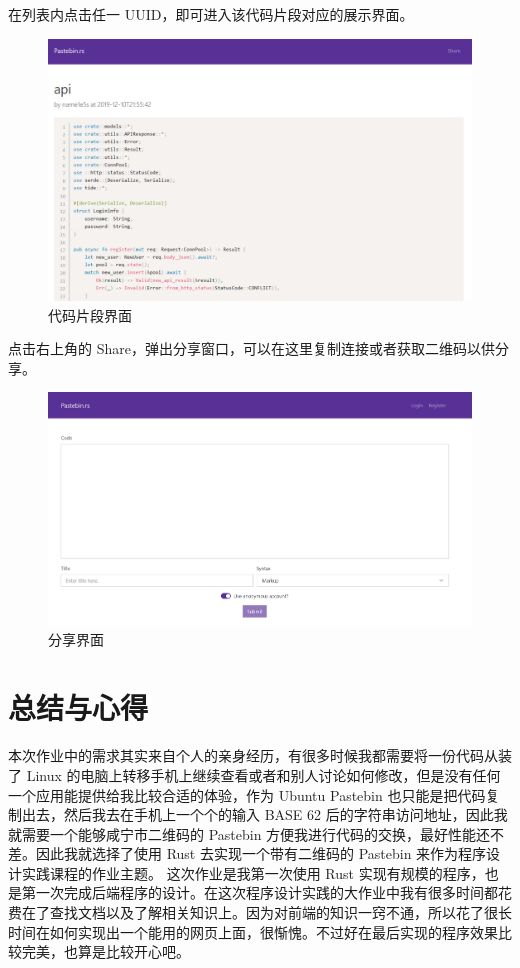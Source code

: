 \documentclass[ichigo,normal,cn]{elegantnote}
\begin{document}
在列表内点击任一 UUID，即可进入该代码片段对应的展示界面。

\begin{figure}[!htbp]
    \centering
    \includegraphics[width=.8\textwidth]{paste}
    \caption{代码片段界面}
    \label{fig:paste}
\end{figure}

点击右上角的 Share，弹出分享窗口，可以在这里复制连接或者获取二维码以供分享。

\begin{figure}[!htbp]
    \centering
    \includegraphics[width=.8\textwidth]{main}
    \caption{分享界面}
    \label{fig:share}
\end{figure}

\section{总结与心得}
本次作业中的需求其实来自个人的亲身经历，有很多时候我都需要将一份代码从装了 Linux 的电脑上转移手机上继续查看或者和别人讨论如何修改，但是没有任何一个应用能提供给我比较合适的体验，作为 Ubuntu Pastebin 也只能是把代码复制出去，然后我去在手机上一个个的输入 BASE 62 后的字符串访问地址，因此我就需要一个能够咸宁市二维码的 Pastebin 方便我进行代码的交换，最好性能还不差。因此我就选择了使用 Rust 去实现一个带有二维码的 Pastebin 来作为程序设计实践课程的作业主题。
这次作业是我第一次使用 Rust 实现有规模的程序，也是第一次完成后端程序的设计。在这次程序设计实践的大作业中我有很多时间都花费在了查找文档以及了解相关知识上。因为对前端的知识一窍不通，所以花了很长时间在如何实现出一个能用的网页上面，很惭愧。不过好在最后实现的程序效果比较完美，也算是比较开心吧。
\end{document}

